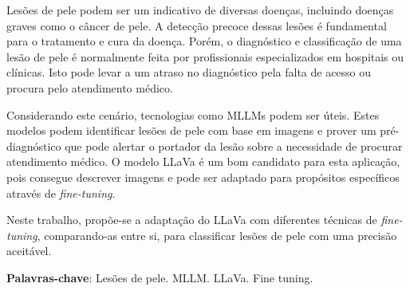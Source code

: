 \imprimircapa

\imprimirfolhaderosto*

\begin{fichacatalografica}
	
\end{fichacatalografica}



% 

\setlength{\absparsep}{18pt}
\begin{resumo}
	\SingleSpacing

	Lesões de pele podem ser um indicativo de diversas doenças, incluindo doenças graves como o câncer de pele. A detecção precoce dessas lesões é fundamental para o
	tratamento e cura da doença. Porém, o diagnóstico e classificação de uma lesão de pele é normalmente feita por profissionais especializados em hospitais ou clínicas.
	Isto pode levar a um atraso no diagnóstico pela falta de acesso ou procura pelo atendimento médico.

	Considerando este cenário, tecnologias como \ac{MLLMs} podem ser úteis. Estes modelos podem identificar lesões de pele com base em imagens e prover um pré-diagnóstico
	que pode alertar o portador da lesão sobre a necessidade de procurar atendimento médico. O modelo \ac{LLaVa} é um bom candidato para esta aplicação, pois consegue
	descrever imagens e pode ser adaptado para propósitos específicos através de \textit{fine-tuning}.

	Neste trabalho, propõe-se a adaptação do \ac{LLaVa} com diferentes técnicas de \textit{fine-tuning}, comparando-as entre si, para classificar lesões de pele com uma
	precisão aceitável.

	\textbf{Palavras-chave}: Lesões de pele. MLLM. LLaVa. Fine tuning.
\end{resumo}

